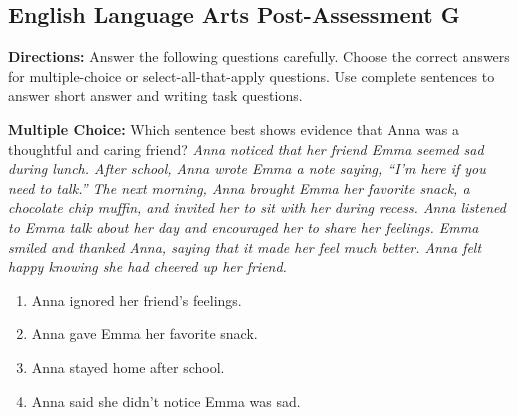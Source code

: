 \documentclass[12pt]{article}
\begin{document}
\subsection*{English Language Arts Post-Assessment G}
\onehalfspacing

\begin{tcolorbox}[colframe=black!50, colback=white, title=Assessment Girections]
\textbf{Directions:} Answer the following questions carefully. Choose the correct answers for multiple-choice or select-all-that-apply questions. Use complete sentences to answer short answer and writing task questions.
\end{tcolorbox}

\begin{tcolorbox}[colframe=black!50, colback=white, title=Question 1]
\textbf{Multiple Choice:} Which sentence best shows evidence that Anna was a thoughtful and caring friend?  
\textit{Anna noticed that her friend Emma seemed sad during lunch. After school, Anna wrote Emma a note saying, “I’m here if you need to talk.” The next morning, Anna brought Emma her favorite snack, a chocolate chip muffin, and invited her to sit with her during recess. Anna listened to Emma talk about her day and encouraged her to share her feelings. Emma smiled and thanked Anna, saying that it made her feel much better. Anna felt happy knowing she had cheered up her friend.}  
\begin{enumerate}[label=(\Alph*)]
\item Anna ignored her friend’s feelings.  
\item Anna gave Emma her favorite snack.  
\item Anna stayed home after school.  
\item Anna said she didn’t notice Emma was sad.  
\end{enumerate}
\end{tcolorbox}
\end{document}
